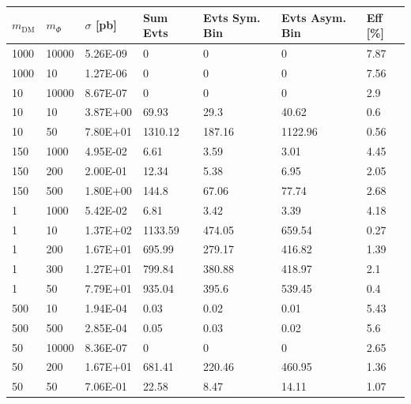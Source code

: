 \begin{table}[h!]
\centering
\begin{tabular}{lllllll}
\hline
$m_\textrm{DM}$ & $m_\Phi$             & $\sigma$ [pb] & Sum Evts       & Evts Sym. Bin & Evts Asym. Bin & Eff  [\%]   \\\hline
1000  & 10000 & 5.26E-09 & 0       & 0      & 0       & 7.87 \\
1000  & 10    & 1.27E-06 & 0       & 0      & 0       & 7.56 \\
10  & 10000   & 8.67E-07 & 0       & 0      & 0       & 2.9  \\
10  & 10      & 3.87E+00 & 69.93   & 29.3   & 40.62   & 0.6  \\
10  & 50      & 7.80E+01 & 1310.12 & 187.16 & 1122.96 & 0.56 \\
150  & 1000   & 4.95E-02 & 6.61    & 3.59   & 3.01    & 4.45 \\
150  & 200    & 2.00E-01 & 12.34   & 5.38   & 6.95    & 2.05 \\
150  & 500    & 1.80E+00 & 144.8   & 67.06  & 77.74   & 2.68 \\
1  & 1000     & 5.42E-02 & 6.81    & 3.42   & 3.39    & 4.18 \\
1  & 10       & 1.37E+02 & 1133.59 & 474.05 & 659.54  & 0.27 \\
1  & 200      & 1.67E+01 & 695.99  & 279.17 & 416.82  & 1.39 \\
1  & 300      & 1.27E+01 & 799.84  & 380.88 & 418.97  & 2.1  \\
1  & 50       & 7.79E+01 & 935.04  & 395.6  & 539.45  & 0.4  \\
500  & 10     & 1.94E-04 & 0.03    & 0.02   & 0.01    & 5.43 \\
500  & 500    & 2.85E-04 & 0.05    & 0.03   & 0.02    & 5.6  \\
50  & 10000   & 8.36E-07 & 0       & 0      & 0       & 2.65 \\
50  & 200     & 1.67E+01 & 681.41  & 220.46 & 460.95  & 1.36 \\
50  & 50      & 7.06E-01 & 22.58   & 8.47   & 14.11   & 1.07\\

\end{tabular}
\end{table}

